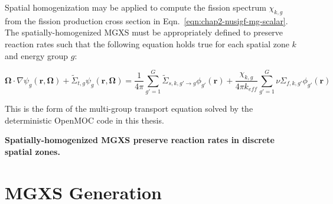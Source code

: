 \noindent Spatial homogenization may be applied to compute the fission spectrum $\chi_{k,g}$ from the fission production cross section in Eqn.~\ref{eqn:chap2-nusigf-mg-scalar}. The spatially-homogenized \ac{MGXS} must be appropriately defined to preserve reaction rates such that the following equation holds true for each spatial zone $k$ and energy group $g$:

\begin{dmath}
\label{eqn:chap2-transport-mg-5}
\mathbf{\Omega} \cdot \nabla \psi_{g}(\mathbf{r},\mathbf{\Omega}) + \tilde{\Sigma}_{t,g}\psi_{g}(\mathbf{r},\mathbf{\Omega}) = \frac{1}{4\pi} \sum_{g'=1}^{G} \tilde{\Sigma}_{s,k,g' \rightarrow g}\phi_{g'}(\mathbf{r}) + \frac{\chi_{k,g}}{4\pi k_{eff}}\sum_{g'=1}^{G} \nu\Sigma_{f,k,g'}\phi_{g'}(\mathbf{r})
\end{dmath}



\noindent This is the form of the multi-group transport equation solved by the deterministic OpenMOC code in this thesis. 

\begin{emphbox}
\textbf{Spatially-homogenized \ac{MGXS} preserve reaction rates in discrete spatial zones.}
\end{emphbox}


\section{MGXS Generation}
\label{sec:chap2-mgxs-lib}

